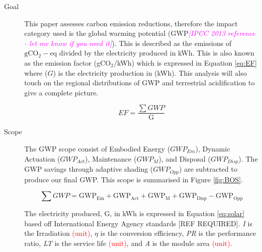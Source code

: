 \begin{description}
\item[Goal] This paper assesses carbon emission reductions, therefore the impact category used is the global warming potential (GWP\textcolor{magenta}{\textit{[IPCC 2013 reference - let me know if you need it]}}). This is described as the emissions of ${\mathrm{gCO_2-eq}}$ divided by the electricity produced in kWh. This is also known as the emission factor (gCO$_2$/kWh) which is expressed in Equation \ref{eq:EF} where ($G$) is the electricity production in (kWh). This analysis will also touch on the regional distributions of GWP and terrestrial acidification to give a complete picture.

\begin{equation}
EF=\frac{{\sum GWP}}{\mathrm{G}}
\label{eq:EF}
\end{equation}

\item[Scope] The GWP scope consist of Embodied Energy ($GWP_{Em}$), Dynamic Actuation ($GWP_{Act}$), Maintenance ($GWP_{M}$), and Disposal ($GWP_{Disp}$). The GWP savings through adaptive shading ($GWP_{Opp}$) are subtracted to produce our final GWP. This scope is summarised in Figure \ref{fig:BOS}.

\begin{equation}
\sum GWP={\mathrm{GWP_{Em}  + GWP_{Act} + GWP_{M} + GWP_{Disp} - GWP_{Opp} }}
\label{eq:GWP}
\end{equation}








The electricity produced, G, in kWh is expressed in Equation \ref{eq:solar} based off International Energy Agency standards [REF REQUIRED]. \textit{I} is the Irradiation \textcolor{red}{(unit)}, ${\eta}$ is the conversion efficiency, \textit{PR} is the performance ratio, \textit{LT} is the service life \textcolor{red}{(unit)}, and \textit{A} is the module area \textcolor{red}{(unit)}.


\end{description}
